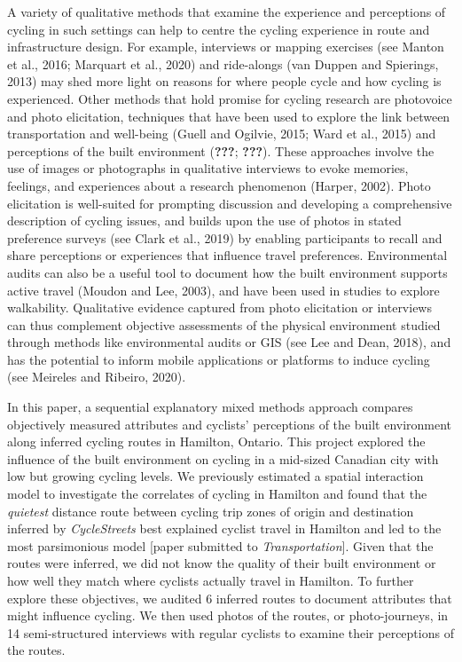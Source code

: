 \documentclass[]{elsarticle} %
\begin{document}
A variety of qualitative methods that examine the experience and
perceptions of cycling in such settings can help to centre the cycling
experience in route and infrastructure design. For example, interviews
or mapping exercises (see Manton et al., 2016; Marquart et al., 2020)
and ride-alongs (van Duppen and Spierings, 2013) may shed more light on
reasons for where people cycle and how cycling is experienced. Other
methods that hold promise for cycling research are photovoice and photo
elicitation, techniques that have been used to explore the link between
transportation and well-being (Guell and Ogilvie, 2015; Ward et al.,
2015) and perceptions of the built environment ({\textbf{???}};
{\textbf{???}}). These approaches involve the use of images or
photographs in qualitative interviews to evoke memories, feelings, and
experiences about a research phenomenon (Harper, 2002). Photo
elicitation is well-suited for prompting discussion and developing a
comprehensive description of cycling issues, and builds upon the use of
photos in stated preference surveys (see Clark et al., 2019) by enabling
participants to recall and share perceptions or experiences that
influence travel preferences. Environmental audits can also be a useful
tool to document how the built environment supports active travel
(Moudon and Lee, 2003), and have been used in studies to explore
walkability. Qualitative evidence captured from photo elicitation or
interviews can thus complement objective assessments of the physical
environment studied through methods like environmental audits or GIS
(see Lee and Dean, 2018), and has the potential to inform mobile
applications or platforms to induce cycling (see Meireles and Ribeiro,
2020).

In this paper, a sequential explanatory mixed methods approach compares
objectively measured attributes and cyclists' perceptions of the built
environment along inferred cycling routes in Hamilton, Ontario. This
project explored the influence of the built environment on cycling in a
mid-sized Canadian city with low but growing cycling levels. We
previously estimated a spatial interaction model to investigate the
correlates of cycling in Hamilton and found that the \emph{quietest}
distance route between cycling trip zones of origin and destination
inferred by \emph{CycleStreets} best explained cyclist travel in
Hamilton and led to the most parsimonious model {[}paper submitted to
\emph{Transportation}{]}. Given that the routes were inferred, we did
not know the quality of their built environment or how well they match
where cyclists actually travel in Hamilton. To further explore these
objectives, we audited 6 inferred routes to document attributes that
might influence cycling. We then used photos of the routes, or
photo-journeys, in 14 semi-structured interviews with regular cyclists
to examine their perceptions of the routes.
\end{document}
